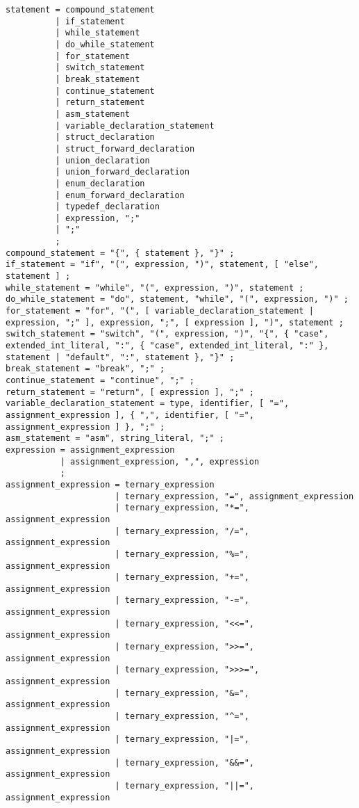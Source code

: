 \documentclass[letterpaper,12pt]{book}
\begin{document}
\begin{lstlisting}[breaklines=true]
statement = compound_statement
          | if_statement
          | while_statement
          | do_while_statement
          | for_statement
          | switch_statement
          | break_statement
          | continue_statement
          | return_statement
          | asm_statement
          | variable_declaration_statement
          | struct_declaration
          | struct_forward_declaration
          | union_declaration
          | union_forward_declaration
          | enum_declaration
          | enum_forward_declaration
          | typedef_declaration
          | expression, ";"
          | ";"
          ;
compound_statement = "{", { statement }, "}" ;
if_statement = "if", "(", expression, ")", statement, [ "else", statement ] ;
while_statement = "while", "(", expression, ")", statement ;
do_while_statement = "do", statement, "while", "(", expression, ")" ;
for_statement = "for", "(", [ variable_declaration_statement | expression, ";" ], expression, ";", [ expression ], ")", statement ;
switch_statement = "switch", "(", expression, ")", "{", { "case", extended_int_literal, ":", { "case", extended_int_literal, ":" }, statement | "default", ":", statement }, "}" ;
break_statement = "break", ";" ;
continue_statement = "continue", ";" ;
return_statement = "return", [ expression ], ";" ;
variable_declaration_statement = type, identifier, [ "=", assignment_expression ], { ",", identifier, [ "=", assignment_expression ] }, ";" ;
asm_statement = "asm", string_literal, ";" ;
expression = assignment_expression
           | assignment_expression, ",", expression
           ;
assignment_expression = ternary_expression
                      | ternary_expression, "=", assignment_expression
                      | ternary_expression, "*=", assignment_expression
                      | ternary_expression, "/=", assignment_expression
                      | ternary_expression, "%=", assignment_expression
                      | ternary_expression, "+=", assignment_expression
                      | ternary_expression, "-=", assignment_expression
                      | ternary_expression, "<<=", assignment_expression
                      | ternary_expression, ">>=", assignment_expression
                      | ternary_expression, ">>>=", assignment_expression
                      | ternary_expression, "&=", assignment_expression
                      | ternary_expression, "^=", assignment_expression
                      | ternary_expression, "|=", assignment_expression
                      | ternary_expression, "&&=", assignment_expression
                      | ternary_expression, "||=", assignment_expression

\end{lstlisting}
\end{document}
